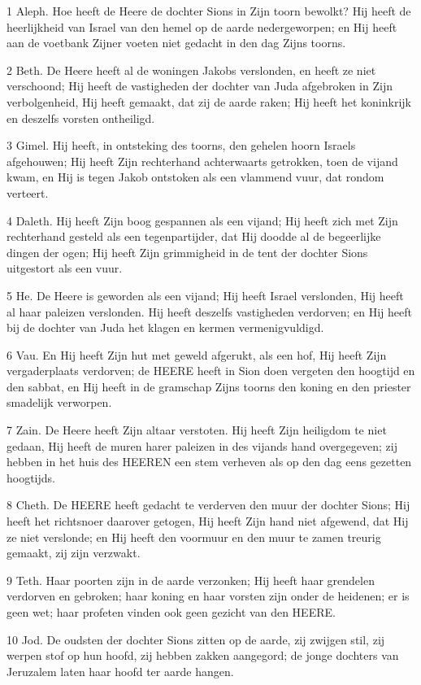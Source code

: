\par 1 Aleph. Hoe heeft de Heere de dochter Sions in Zijn toorn bewolkt? Hij heeft de heerlijkheid van Israel van den hemel op de aarde nedergeworpen; en Hij heeft aan de voetbank Zijner voeten niet gedacht in den dag Zijns toorns.
\par 2 Beth. De Heere heeft al de woningen Jakobs verslonden, en heeft ze niet verschoond; Hij heeft de vastigheden der dochter van Juda afgebroken in Zijn verbolgenheid, Hij heeft gemaakt, dat zij de aarde raken; Hij heeft het koninkrijk en deszelfs vorsten ontheiligd.
\par 3 Gimel. Hij heeft, in ontsteking des toorns, den gehelen hoorn Israels afgehouwen; Hij heeft Zijn rechterhand achterwaarts getrokken, toen de vijand kwam, en Hij is tegen Jakob ontstoken als een vlammend vuur, dat rondom verteert.
\par 4 Daleth. Hij heeft Zijn boog gespannen als een vijand; Hij heeft zich met Zijn rechterhand gesteld als een tegenpartijder, dat Hij doodde al de begeerlijke dingen der ogen; Hij heeft Zijn grimmigheid in de tent der dochter Sions uitgestort als een vuur.
\par 5 He. De Heere is geworden als een vijand; Hij heeft Israel verslonden, Hij heeft al haar paleizen verslonden. Hij heeft deszelfs vastigheden verdorven; en Hij heeft bij de dochter van Juda het klagen en kermen vermenigvuldigd.
\par 6 Vau. En Hij heeft Zijn hut met geweld afgerukt, als een hof, Hij heeft Zijn vergaderplaats verdorven; de HEERE heeft in Sion doen vergeten den hoogtijd en den sabbat, en Hij heeft in de gramschap Zijns toorns den koning en den priester smadelijk verworpen.
\par 7 Zain. De Heere heeft Zijn altaar verstoten. Hij heeft Zijn heiligdom te niet gedaan, Hij heeft de muren harer paleizen in des vijands hand overgegeven; zij hebben in het huis des HEEREN een stem verheven als op den dag eens gezetten hoogtijds.
\par 8 Cheth. De HEERE heeft gedacht te verderven den muur der dochter Sions; Hij heeft het richtsnoer daarover getogen, Hij heeft Zijn hand niet afgewend, dat Hij ze niet verslonde; en Hij heeft den voormuur en den muur te zamen treurig gemaakt, zij zijn verzwakt.
\par 9 Teth. Haar poorten zijn in de aarde verzonken; Hij heeft haar grendelen verdorven en gebroken; haar koning en haar vorsten zijn onder de heidenen; er is geen wet; haar profeten vinden ook geen gezicht van den HEERE.
\par 10 Jod. De oudsten der dochter Sions zitten op de aarde, zij zwijgen stil, zij werpen stof op hun hoofd, zij hebben zakken aangegord; de jonge dochters van Jeruzalem laten haar hoofd ter aarde hangen.
